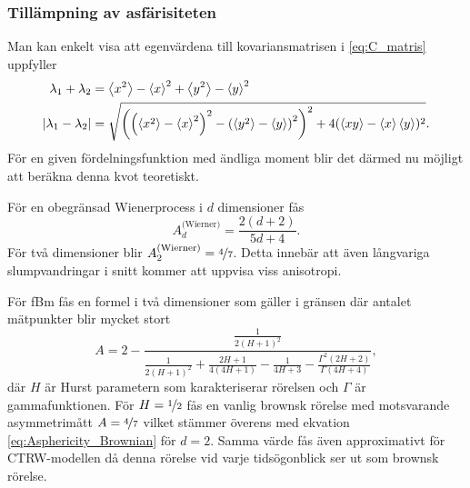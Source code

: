 \subsubsection{Tillämpning av asfärisiteten}
Man kan enkelt visa att egenvärdena till kovariansmatrisen i \eqref{eq:C_matris} uppfyller~\cite{Hong_asymmetri1998}
\begin{equation}
\begin{aligned}
\lambda_1+\lambda_2 
&= \ev{x^2}-\ev{x}^2+\ev{y^2}-\ev{y}^2 
\\
\abs{\lambda_1-\lambda_2} 
&=\sqrt{\left(
            \left(\ev{x^2}-\ev{x}^2\right)^2
            -\left(\ev{y^2}-\ev{y}\right)^2
        \right)^2 
        +4(\ev{xy}-\ev{x}\ev{y})^2
}.
\end{aligned}
\end{equation}
För en given fördelningsfunktion med ändliga moment blir det därmed nu möjligt att beräkna denna kvot teoretiskt.

För en obegränsad Wienerprocess i $d$ dimensioner fås~\cite{Rudnick_Asphericity1986}
\begin{equation} \label{eq:Asphericity_Brownian}
    A_d^\text{(Wierner)}=\frac{2(d+2)}{5d+4}.
\end{equation}
För två dimensioner blir $A_2^\text{(Wierner)}=\nicefrac{4}{7}$. Detta innebär att även långvariga slumpvandringar i snitt kommer att uppvisa viss anisotropi.

För fBm fås en formel i två dimensioner som gäller i gränsen där antalet mätpunkter blir mycket stort ~\cite{Hong_asymmetri1998}
\begin{equation} \label{eq:A_fBm}
A=2-
\frac{\frac{1}{2(H+1)^2}}{\frac{1}{2(H+1)^2}+\frac{2H+1}{4(4H+1)}-\frac{1}{4H+3}-\frac{\Gamma^2(2H+2)}{\Gamma(4H+4)}},
\end{equation}
där $H$ är Hurst parametern som karakteriserar rörelsen och $\Gamma$ är gammafunktionen. För $H=\nicefrac{1}{2}$ fås en vanlig brownsk rörelse med motsvarande  asymmetrimått $A=\nicefrac{4}{7}$ vilket stämmer överens med ekvation \eqref{eq:Asphericity_Brownian} för $d=2$. Samma värde fås även approximativt för CTRW-modellen \cite{Ernst_ACTRW2012} då denna rörelse vid varje tidsögonblick ser ut som brownsk rörelse. 




 
